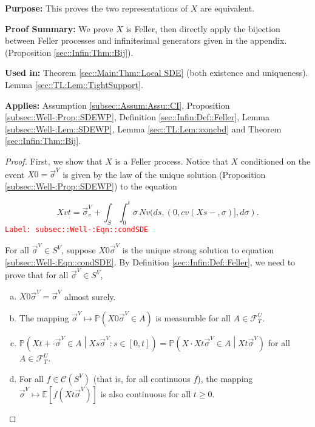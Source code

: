 \documentclass[12pt]{article}
\newcommand{\mb}{\mathbb}
\newcommand{\mc}{\mathcal}
\newcommand{\tr}{\textcolor{red}}
\newcommand{\labe}[1]{\tr{\texttt{Label: #1}}}
\newcommand{\purpose}{\textbf{Purpose: }}
\newcommand{\pfsum}{\textbf{Proof Summary: }}
\newcommand{\usein}{\textbf{Used in: }}
\newcommand{\app}{\textbf{Applies: }}
\newcommand{\pr}{\mb{P}}							%
\newcommand{\ex}[1]{\mb{E}\left[#1\right]}			%
\renewcommand{\v}{v}							%
\renewcommand{\U}{U}							%
\renewcommand{\S}{S}							%
\newcommand{\s}{\sigma}							%
\newcommand{\sv}{\vec{\s}}						%
\newcommand{\T}{T}								%
\renewcommand{\t}{t}							%
\renewcommand{\tt}{s}							%
\newcommand{\F}{\mc{F}}							%
\newcommand{\X}{X}								%
\newcommand{\IGr}{c}							%
\newcommand{\carp}[1]{^{#1}}					%
\newcommand{\vsi}[1]{^{#1}}						%
\newcommand{\cind}[1]{_{#1}}					%
\newcommand{\ts}[1]{_{#1}}						%
\newcommand{\cont}{\mc{C}}						%
\newcommand{\poiss}{N}							%
\begin{document}
\purpose This proves the two representations of \(\X{}{}\) are equivalent.

\pfsum We prove \(\X{}{}\) is Feller, then directly apply the bijection between Feller processes and infinitesimal generators given in the appendix. (Proposition \ref{sec::Infin:Thm::Bij}).

\usein Theorem \ref{sec::Main:Thm::Local SDE} (both existence and uniqueness). Lemma \ref{sec::TL:Lem::TightSupport}.

\app Assumption \ref{subsec::Assum:Assu::CI}, Proposition \ref{subsec::Well-:Prop::SDEWP}, Definition \ref{sec::Infin:Def::Feller}, Lemma \ref{subsec::Well-:Lem::SDEWP}, Lemma \ref{sec::TL:Lem::concbd} and Theorem \ref{sec::Infin:Thm::Bij}.

\begin{proof}
First, we show that \(\X{}{}\) is a Feller process. Notice that \(\X{}{}\) conditioned on the event \(\X{}{0} = \sv\cind{}\vsi{V}\) is given by the law of the unique solution (Proposition \ref{subsec::Well-:Prop::SDEWP}) to the equation

\begin{equation}
\X{\v}{\t} = \sv\cind{\v}\vsi{V} + \int_\S\int_0^\t \s\,\poiss{\v}(d\tt,(0,\IGr{\v}(\X{}{\tt-},\s)],d\s).
\label{subsec::Well-:Eqn::condSDE}
\end{equation}
\labe{subsec::Well-:Eqn::condSDE}

For all \(\sv\cind{}\vsi{V}\in\S\carp{V}\), suppose \(\X{}{0}{\sv\cind{}\vsi{V}}\) is the unique strong solution to equation \eqref{subsec::Well-:Eqn::condSDE}. By Definition \ref{sec::Infin:Def::Feller}, we need to prove that for all \(\sv\cind{}\vsi{V}\in \S\carp{V}\),

\begin{enumerate}[(a)]
\item \(\X{}{0}{\sv\cind{}\vsi{V}} = \sv\cind{}\vsi{V}\) almost surely.

\item The mapping \(\sv\cind{}\vsi{V}\mapsto \pr\left(\X{}{0}{\sv\cind{}\vsi{V}}\in A\right)\) is measurable for all \(A\in \F\vsi{\U}\ts{\T}\).

\item \(\pr\left(\X{}{\t+\cdot}{\sv\cind{}\vsi{V}}\in A\middle|\X{}{\tt}{\sv\cind{}\vsi{V}}:\tt \in [0,\t]\right) = \pr\left(\X{}{\cdot}{\X{}{\t}{\sv\cind{}\vsi{V}}} \in A\middle| \X{}{\t}{\sv\cind{}\vsi{V}} \right)\) for all \(A \in \F\vsi{\U}\ts{\T}\).

\item For all \(f \in \cont(\S\carp{V})\) (that is, for all continuous \(f\)), the mapping \(\sv\cind{}\vsi{V}\mapsto \ex{f(\X{}{\t}{\sv\cind{}\vsi{V}})}\) is also continuous for all \(\t\geq 0\).
\end{enumerate}


\end{proof}
\end{document}
